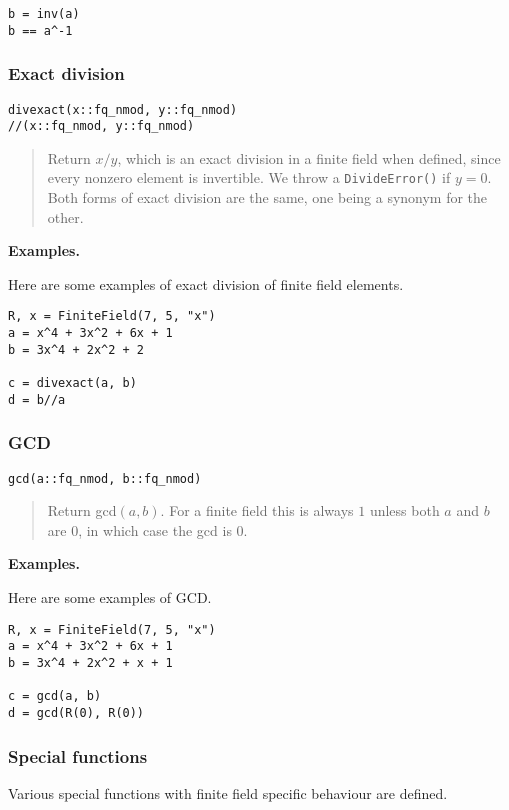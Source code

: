 \documentclass[a4paper,10pt]{article}
\newcommand{\code}{\lstinline}
\newcommand{\desc}[1]{\vspace{-3mm}\begin{quote}#1\end{quote}}
\begin{document}
{{\begin{lstlisting}
b = inv(a)
b == a^-1
\end{lstlisting}

\subsubsection{Exact division}

\begin{lstlisting}
divexact(x::fq_nmod, y::fq_nmod)
//(x::fq_nmod, y::fq_nmod)
\end{lstlisting}

\desc{Return $x/y$, which is an exact division in a finite field when defined,
since every nonzero element is invertible. We throw a \code{DivideError()} if
$y = 0$. Both forms of exact division are the same, one being a synonym for 
the other.}

\textbf{Examples.}

Here are some examples of exact division of finite field elements.

\begin{lstlisting}
R, x = FiniteField(7, 5, "x")
a = x^4 + 3x^2 + 6x + 1
b = 3x^4 + 2x^2 + 2

c = divexact(a, b)
d = b//a
\end{lstlisting}

\subsubsection{GCD}

\begin{lstlisting}
gcd(a::fq_nmod, b::fq_nmod)
\end{lstlisting}

\desc{Return gcd$(a, b)$. For a finite field this is always $1$ unless both
$a$ and $b$ are $0$, in which case the gcd is $0$.}

\textbf{Examples.}

Here are some examples of GCD.

\begin{lstlisting}
R, x = FiniteField(7, 5, "x")
a = x^4 + 3x^2 + 6x + 1
b = 3x^4 + 2x^2 + x + 1

c = gcd(a, b)
d = gcd(R(0), R(0))
\end{lstlisting}

\subsubsection{Special functions}

Various special functions with finite field specific behaviour are
defined.

}}
\end{document}

